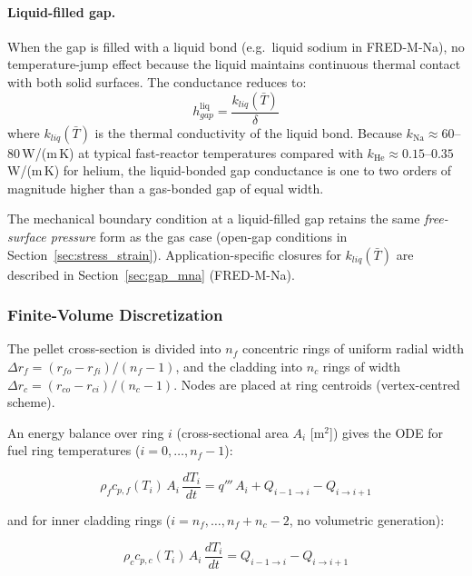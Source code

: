 \begin{refsection}
\paragraph{Liquid-filled gap.} When the gap is filled with a liquid bond (e.g.\ liquid sodium in FRED-M-Na), no temperature-jump effect because the liquid maintains continuous thermal contact with both solid surfaces.  The conductance reduces to:
\begin{equation}
  h_{gap}^{\mathrm{liq}} = \frac{k_{liq}(\bar{T})}{\delta}
  \label{eq:hgap_liq}
\end{equation}
where $k_{liq}(\bar{T})$ is the thermal conductivity of the liquid bond. Because $k_{\mathrm{Na}} \approx 60$--$80$\,W/(m\,K) at typical fast-reactor temperatures compared with $k_{\mathrm{He}} \approx 0.15$--$0.35$\,W/(m\,K) for helium, the liquid-bonded gap conductance is one to two orders of magnitude higher than a gas-bonded gap of equal width.

The mechanical boundary condition at a liquid-filled gap retains the same \emph{free-surface pressure} form as the gas case (open-gap conditions in Section~\ref{sec:stress_strain}).  Application-specific closures for $k_{liq}(\bar{T})$ are described in Section~\ref{sec:gap_mna} (FRED-M-Na).

\subsubsection{Finite-Volume Discretization}

The pellet cross-section is divided into $n_f$ concentric rings of uniform radial width $\Delta r_f = (r_{fo} - r_{fi})/(n_f - 1)$, and the cladding into $n_c$ rings of width $\Delta r_c = (r_{co} - r_{ci})/(n_c - 1)$.  Nodes are placed at ring centroids (vertex-centred scheme).

An energy balance over ring $i$ (cross-sectional area $A_i$ [m$^2$]) gives the ODE for fuel ring temperatures ($i = 0,\ldots,n_f - 1$):

\begin{equation}
  \rho_f c_{p,f}(T_i)\,A_i\,\frac{dT_i}{dt}
  = q'''\,A_i + Q_{i-1 \to i} - Q_{i \to i+1}
  \label{eq:heat_ode_fuel}
\end{equation}

and for inner cladding rings ($i = n_f,\ldots,n_f + n_c - 2$, no volumetric generation):

\begin{equation}
  \rho_c c_{p,c}(T_i)\,A_i\,\frac{dT_i}{dt}
  = Q_{i-1 \to i} - Q_{i \to i+1}
  \label{eq:heat_ode_clad}
\end{equation}


\end{refsection}
